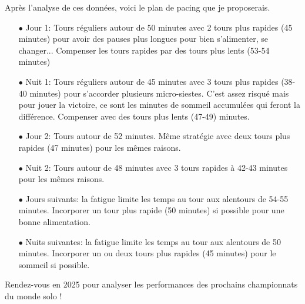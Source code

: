 \documentclass[a4paper,12pt]{article}
\begin{document}
Après l'analyse de ces données, voici le plan de pacing que je proposerais.
\begin{itemize}
	\item[$\bullet$] Jour 1: Tours réguliers autour de 50 minutes avec 2 tours plus rapides (45 minutes) pour avoir des pauses plus longues pour bien s'alimenter, se changer... Compenser les tours rapides par des tours plus lents (53-54 minutes)
	\item[$\bullet$]Nuit 1: Tours réguliers autour de 45 minutes avec 3 tours plus rapides (38-40 minutes) pour s'accorder plusieurs micro-siestes. C'est assez risqué mais pour jouer la victoire, ce sont les minutes de sommeil accumulées qui feront la différence. Compenser avec des tours plus lents (47-49) minutes.
	\item[$\bullet$]Jour 2: Tours autour de 52 minutes. Même stratégie avec deux tours plus rapides (47 minutes) pour les mêmes raisons.
\item[$\bullet$]	Nuit 2: Tours autour de 48 minutes avec 3 tours rapides à 42-43 minutes pour les mêmes raisons.
	\item[$\bullet$]Jours suivants: la fatigue limite les temps au tour aux alentours de 54-55 minutes. Incorporer un tour plus rapide (50 minutes) si possible pour une bonne alimentation.
	\item[$\bullet$]Nuits suivantes: la fatigue limite les temps au tour aux alentours de 50 minutes. Incorporer un ou deux tours plus rapides (45 minutes) pour le sommeil si possible.
\end{itemize}

\medskip

Rendez-vous en 2025 pour analyser les performances des prochains championnats du monde solo !



	
\end{document}
